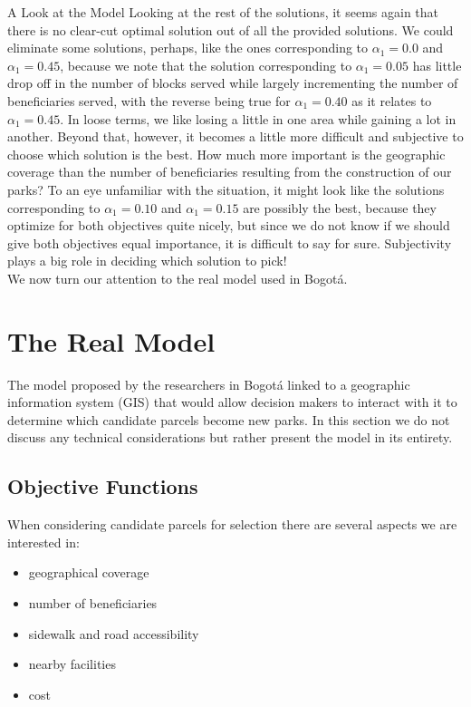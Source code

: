 \documentclass[12pt]{pom_thesis}
\theoremstyle{definition}
\begin{document}
\begin{chapter}{A Look at the Model}
Looking at the rest of the solutions, it seems again that there is no clear-cut optimal solution out of all the provided solutions. We could eliminate some solutions, perhaps, like the ones corresponding to $\alpha_1 = 0.0$ and $\alpha_1 = 0.45$, because we note that the solution corresponding to $\alpha_1 = 0.05$ has little drop off in the number of blocks served while largely incrementing the number of beneficiaries served, with the reverse being true for $\alpha_1 = 0.40$ as it relates to $\alpha_1 = 0.45$. In loose terms, we like losing a little in one area while gaining a lot in another. Beyond that, however, it becomes a little more difficult and subjective to choose which solution is the best. How much more important is the geographic coverage than the number of beneficiaries resulting from the construction of our parks? To an eye unfamiliar with the situation, it might look like the solutions corresponding to $\alpha_1 = 0.10$ and $\alpha_1 = 0.15$ are possibly the best, because they optimize for both objectives quite nicely, but since we do not know if we should give both objectives equal importance, it is difficult to say for sure. Subjectivity plays a big role in deciding which solution to pick! \\

We now turn our attention to the real model used in Bogot\'{a}.
%
%
\section{The Real Model}
The model proposed by the researchers in Bogot\'{a} linked to a geographic information system (GIS) that would allow decision makers to interact with it to determine which candidate parcels become new parks. In this section we do not discuss any technical considerations but rather present the model in its entirety. \\

%
%
\subsection{Objective Functions}
When considering candidate parcels for selection there are several aspects we are interested in:
\begin{itemize}
\item geographical coverage 
\item number of beneficiaries
\item sidewalk and road accessibility
\item nearby facilities
\item cost 
\end{itemize}


\end{chapter}
\end{document}
